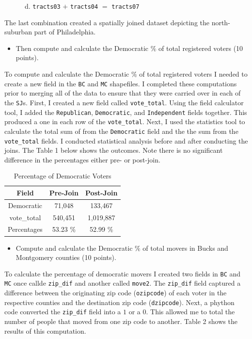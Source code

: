 \documentclass[]{article}
\providecommand{\tightlist}{%
  \setlength{\itemsep}{0pt}\setlength{\parskip}{0pt}}
\begin{document}
~~~~~~d. \texttt{tracts03} \(+\) \texttt{tracts04} \(=\)
\texttt{tracts07}

The last combination created a spatially joined dataset depicting the
north-suburban part of Philadelphia.

\begin{itemize}
\tightlist
\item
  Then compute and calculate the Democratic \(\%\) of total registered
  voters (10 points).
\end{itemize}

To compute and calculate the Democratic \(\%\) of total registered
voters I needed to create a new field in the \texttt{BC} and \texttt{MC}
shapefiles. I completed these computations prior to merging all of the
data to ensure that they were carried over in each of the \texttt{SJ}s.
First, I created a new field called \texttt{vote\_total}. Using the
field calculator tool, I added the \texttt{Republican},
\texttt{Democratic}, and \texttt{Independent} fields together. This
produced a one in each row of the \texttt{vote\_total}. Next, I used the
statistics tool to calculate the total sum of from the
\texttt{Democratic} field and the the sum from the \texttt{vote\_total}
fields. I conducted statistical analysis before and after conducting the
joins. The Table 1 below shows the outcomes. Note there is no
significant difference in the percentages either pre- or post-join.

\begin{table}[]
\centering
\caption{Percentage of Democratic Voters}
\begin{tabular}{ccc}
Field       & Pre-Join & Post-Join \\
\hline
Democratic  & 71,048   & 133,467   \\
vote\_total & 540,451  & 1,019,887 \\
\hline
\hline
Percentages & 53.23 \% & 52.99 \% 
\end{tabular}
\end{table}

\begin{itemize}
\tightlist
\item
  Compute and calculate the Democratic \(\%\) of total movers in Bucks
  and Montgomery counties (10 points).
\end{itemize}

To calculate the percentage of democratic movers I created two fields in
\texttt{BC} and \texttt{MC} once callde \texttt{zip\_dif} and another
called \texttt{move2}. The \texttt{zip\_dif} field captured a difference
between the originating zip code (\texttt{ozipcode}) of each voter in
the respective counties and the destination zip code
(\texttt{dzipcode}). Next, a phython code converted the
\texttt{zip\_dif} field into a \(1\) or a \(0\). This allowed me to
total the number of people that moved from one zip code to another.
Table 2 shows the results of this computation.
\end{document}
